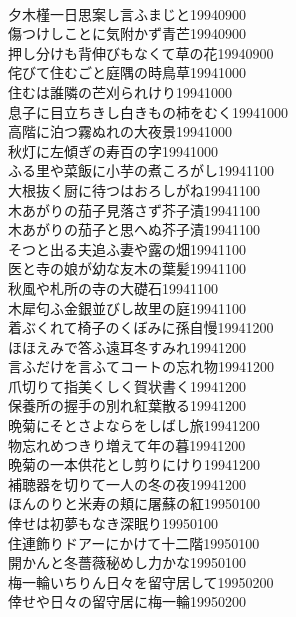 \begin{multicols}{2}
\\夕木槿一日思案し言ふまじと\hfill{19940900}
\\傷つけしことに気附かず青芒\hfill{19940900}
\\押し分けも背伸びもなくて草の花\hfill{19940900}
\\侘びて住むごと庭隅の時鳥草\hfill{19941000}
\\住むは誰隣の芒刈られけり\hfill{19941000}
\\息子に目立ちきし白きもの柿をむく\hfill{19941000}
\\高階に泊つ霧ぬれの大夜景\hfill{19941000}
\\秋灯に左傾ぎの寿百の字\hfill{19941000}
\\ふる里や菜飯に小芋の煮ころがし\hfill{19941100}
\\大根抜く厨に待つはおろしがね\hfill{19941100}
\\木あがりの茄子見落さず芥子漬\hfill{19941100}
\\木あがりの茄子と思へぬ芥子漬\hfill{19941100}
\\そつと出る夫追ふ妻や露の畑\hfill{19941100}
\\医と寺の娘が幼な友木の葉髪\hfill{19941100}
\\秋風や札所の寺の大礎石\hfill{19941100}
\\木犀匂ふ金銀並びし故里の庭\hfill{19941100}
\\着ぶくれて椅子のくぼみに孫自慢\hfill{19941200}
\\ほほえみで答ふ遠耳冬すみれ\hfill{19941200}
\\言ふだけを言ふてコートの忘れ物\hfill{19941200}
\\爪切りて指美くしく賀状書く\hfill{19941200}
\\保養所の握手の別れ紅葉散る\hfill{19941200}
\\晩菊にそとさよならをしばし旅\hfill{19941200}
\\物忘れめつきり増えて年の暮\hfill{19941200}
\\晩菊の一本供花とし剪りにけり\hfill{19941200}
\\補聴器を切りて一人の冬の夜\hfill{19941200}
\\ほんのりと米寿の頬に屠蘇の紅\hfill{19950100}
\\倖せは初夢もなき深眠り\hfill{19950100}
\\住連飾りドアーにかけて十二階\hfill{19950100}
\\開かんと冬薔薇秘めし力かな\hfill{19950100}
\\梅一輪いちりん日々を留守居して\hfill{19950200}
\\倖せや日々の留守居に梅一輪\hfill{19950200}

\end{multicols}
